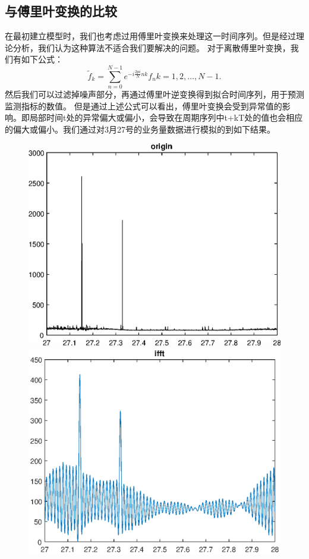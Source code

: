 \documentclass[a4paper]{article}
\begin{document}
\subsection{与傅里叶变换的比较}
\indent 在最初建立模型时，我们也考虑过用傅里叶变换来处理这一时间序列。但是经过理论分析，我们认为这种算法不适合我们要解决的问题。
\indent 对于离散傅里叶变换，我们有如下公式：
\begin{equation}
\tilde f_k=\sum_{n=0}^{N-1}e^{-i\frac{2pi}{N}nk}f_n   k=1,2,\dots,N-1.
\end{equation}
然后我们可以过滤掉噪声部分，再通过傅里叶逆变换得到拟合时间序列，用于预测监测指标的数值。
但是通过上述公式可以看出，傅里叶变换会受到异常值的影响。即局部时间t处的异常偏大或偏小，会导致在周期序列中t+kT处的值也会相应的偏大或偏小。我们通过对3月27号的业务量数据进行模拟的到如下结果。
\begin{figure}[h]
	\begin{minipage}[t]{0.5\linewidth}
    \centering
    \includegraphics[scale=0.4]{pic/before_friouer.eps}
    \end{minipage}
    \begin{minipage}[t]{0.5\linewidth}
    \centering 
	\includegraphics[scale=0.4]{pic/friouer.eps}

\end{minipage}
\end{figure}
\end{document}

